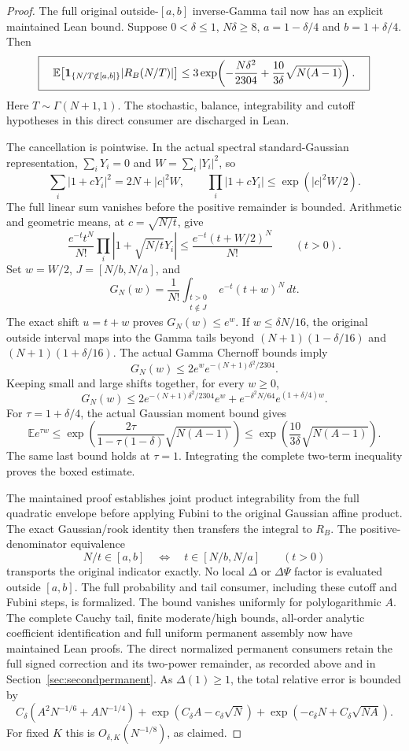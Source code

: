\begin{proof}
The full original outside-\([a,b]\) inverse-Gamma tail now has
an explicit maintained Lean bound. Suppose \(0<\delta\leq1\),
\(N\delta\geq8\), \(a=1-\delta/4\) and \(b=1+\delta/4\). Then
\[
 \boxed{\quad
 \mathbb E\bigl[\mathbf1_{\{N/T\notin[a,b]\}}|R_B(N/T)|\bigr]
 \leq3\exp\!\left(-\frac{N\delta^2}{2304}
       +\frac{10}{3\delta}\sqrt{N(A-1)}\right).
 \quad}
\]
Here \(T\sim\Gamma(N+1,1)\). The stochastic, balance, integrability
and cutoff hypotheses in this direct consumer are discharged in Lean.

The cancellation is pointwise. In the actual spectral standard-Gaussian
representation, \(\sum_iY_i=0\) and \(W=\sum_i|Y_i|^2\), so
\[
 \sum_i|1+cY_i|^2=2N+|c|^2W,\qquad
 \prod_i|1+cY_i|\leq\exp(|c|^2W/2).
\]
The full linear sum vanishes before the positive remainder is bounded.
Arithmetic and geometric means, at \(c=\sqrt{N/t}\), give
\[
 \frac{e^{-t}t^N}{N!}\prod_i|1+\sqrt{N/t}Y_i|
       \leq\frac{e^{-t}(t+W/2)^N}{N!}\qquad(t>0).
\]
Set \(w=W/2\), \(J=[N/b,N/a]\), and
\[
 G_N(w)=\frac1{N!}\int_{\substack{t>0\\t\notin J}}
                                    e^{-t}(t+w)^N\,dt .
\]
The exact shift \(u=t+w\) proves \(G_N(w)\leq e^w\).
If \(w\leq\delta N/16\), the original outside interval maps into
the Gamma tails beyond \((N+1)(1-\delta/16)\) and
\((N+1)(1+\delta/16)\). The actual Gamma Chernoff bounds imply
\[
 G_N(w)\leq2e^w e^{-(N+1)\delta^2/2304}.
\]
Keeping small and large shifts together, for every \(w\geq0\),
\[
 G_N(w)\leq2e^{-(N+1)\delta^2/2304}e^w+
                  e^{-\delta^2N/64}e^{(1+\delta/4)w}.
\]
For \(\tau=1+\delta/4\), the actual Gaussian moment bound gives
\[
 \mathbb E e^{\tau w}
 \leq\exp\!\left(\frac{2\tau}{1-\tau(1-\delta)}
                         \sqrt{N(A-1)}\right)
 \leq\exp\!\left(\frac{10}{3\delta}\sqrt{N(A-1)}\right).
\]
The same last bound holds at \(\tau=1\). Integrating the complete
two-term inequality proves the boxed estimate.

The maintained proof establishes joint product integrability from
the full quadratic envelope before applying Fubini to the original
Gaussian affine product. The exact Gaussian/rook identity then
transfers the integral to \(R_B\). The positive-denominator equivalence
\[
 N/t\in[a,b]\quad\Longleftrightarrow\quad t\in[N/b,N/a]\qquad(t>0)
\]
transports the original indicator exactly. No local \(\Delta\) or
\(\Delta\Psi\) factor is evaluated outside \([a,b]\).
The full probability and tail consumer, including these cutoff and
Fubini steps, is formalized. The bound vanishes uniformly for
polylogarithmic \(A\). The complete Cauchy tail, finite moderate/high
bounds, all-order analytic coefficient identification and full uniform
permanent assembly now have maintained Lean proofs. The direct normalized
permanent consumers retain the full signed correction and its two-power
remainder, as recorded above and in Section~\ref{sec:secondpermanent}.
As \(\Delta(1)\geq1\), the total relative error is bounded by
\[
 C_\delta(A^2N^{-1/6}+AN^{-1/4})
 +\exp(C_\delta A-c_\delta\sqrt N)
 +\exp(-c_\delta N+C_\delta\sqrt{NA}).
\]
For fixed \(K\) this is \(O_{\delta,K}(N^{-1/8})\), as claimed.
\end{proof}

